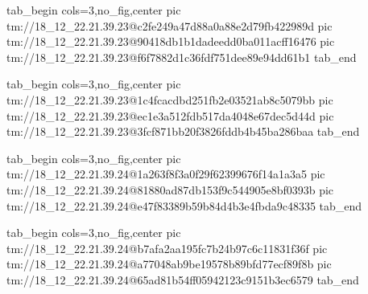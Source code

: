  
 
 
 
 

\qqSecCmtScr


\ifcmt
  tab_begin cols=3,no_fig,center
    pic tm://18_12_22.21.39.23@c2fe249a47d88a0a88e2d79fb422989d
    pic tm://18_12_22.21.39.23@90418db1b1dadeedd0ba011acff16476
    pic tm://18_12_22.21.39.23@f6f7882d1c36fdf751dee89e94dd61b1
  tab_end
\fi


\ifcmt
  tab_begin cols=3,no_fig,center
    pic tm://18_12_22.21.39.23@1c4fcacdbd251fb2e03521ab8c5079bb
    pic tm://18_12_22.21.39.23@ec1e3a512fdb517da4048e67dec5d44d
    pic tm://18_12_22.21.39.23@3fcf871bb20f3826fddb4b45ba286baa
  tab_end
\fi


\ifcmt
  tab_begin cols=3,no_fig,center
    pic tm://18_12_22.21.39.24@1a263f8f3a0f29f62399676f14a1a3a5
    pic tm://18_12_22.21.39.24@81880ad87db153f9c544905e8bf0393b
    pic tm://18_12_22.21.39.24@e47f83389b59b84d4b3e4fbda9c48335
  tab_end
\fi


\ifcmt
  tab_begin cols=3,no_fig,center
    pic tm://18_12_22.21.39.24@b7afa2aa195fc7b24b97c6c11831f36f
    pic tm://18_12_22.21.39.24@a77048ab9be19578b89bfd77ecf89f8b
    pic tm://18_12_22.21.39.24@65ad81b54ff05942123c9151b3ec6579
  tab_end
\fi

